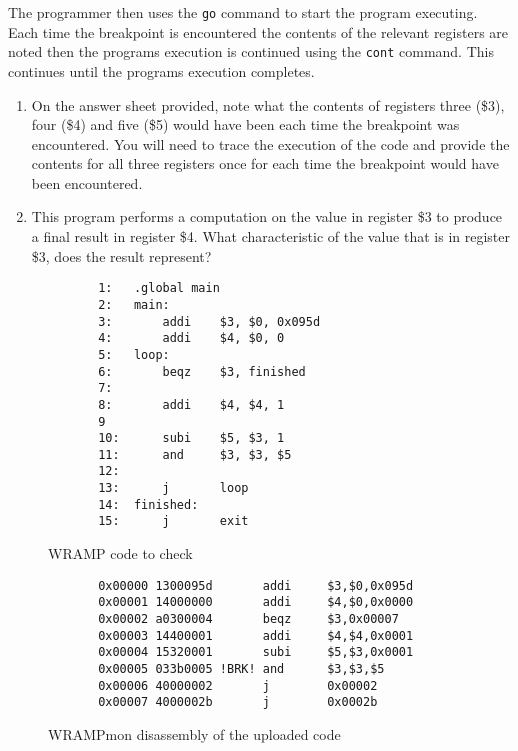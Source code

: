 \documentclass[a4paper,10pt]{article}
\begin{document}
\begin{enumerate}
The programmer then uses the \texttt{go} command to start the program
executing. Each time the breakpoint is encountered the contents of the
relevant registers are noted then the programs execution is continued
using the \texttt{cont} command. This continues until the programs
execution completes.

\begin{enumerate}
\item On the answer sheet provided, note what the contents of registers three
(\$3), four (\$4) and five (\$5) would have been each time the
breakpoint was encountered. You will need to trace the execution of
the code and provide the contents for all three registers once for
each time the breakpoint would have been encountered.

\item This program performs a computation on the value in register \$3 to produce a final result in
register \$4. What characteristic of the value that is in register \$3, does the result represent?
\end{enumerate}


\begin{figure}[h]
{\small
\begin{verbatim}
       1:   .global main
       2:   main:
       3:       addi    $3, $0, 0x095d
       4:       addi    $4, $0, 0
       5:   loop:
       6:       beqz    $3, finished
       7:   
       8:       addi    $4, $4, 1
       9
       10:      subi    $5, $3, 1
       11:      and     $3, $3, $5
       12:   
       13:      j       loop
       14:  finished:
       15:      j       exit
\end{verbatim}
} 
\caption{WRAMP code to check}
\label{fig:bitcount}
\end{figure}

\begin{figure}[h]
{\small
\begin{verbatim}
       0x00000 1300095d       addi     $3,$0,0x095d
       0x00001 14000000       addi     $4,$0,0x0000
       0x00002 a0300004       beqz     $3,0x00007
       0x00003 14400001       addi     $4,$4,0x0001
       0x00004 15320001       subi     $5,$3,0x0001
       0x00005 033b0005 !BRK! and      $3,$3,$5
       0x00006 40000002       j        0x00002
       0x00007 4000002b       j        0x0002b
\end{verbatim}
} 
\caption{WRAMPmon disassembly of the uploaded code}
\label{fig:bitcount-dis}
\end{figure}


\end{enumerate}
\end{document}
